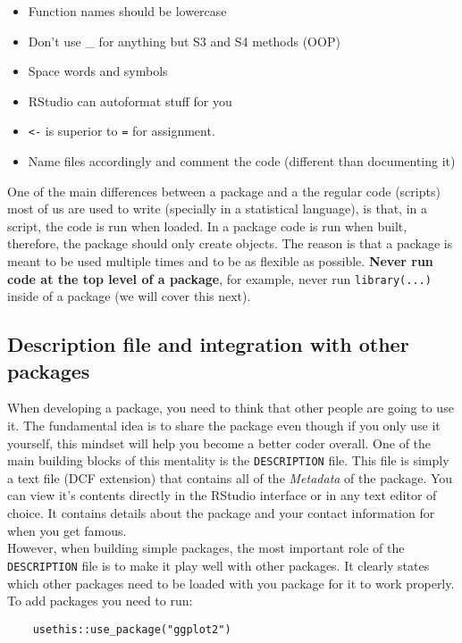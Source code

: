 \documentclass[pdftex,11pt,a4paper]{article}
\begin{document}
\begin{itemize}
	\item Function names should be lowercase 
	\item Don't use \_ for anything but S3 and S4 methods (OOP)
	\item Space words and symbols
	\item RStudio can autoformat stuff for you 
	\item \verb|<-| is superior to \verb|=| for assignment.
	\item Name files accordingly and comment the code (different than documenting it)
\end{itemize}

One of the main differences between a package and a the regular code (scripts) most of us are used to write (specially in a statistical language), is that, in a script, the code is run when loaded. In a package code is run when built, therefore, the package should only create objects. The reason is that a package is meant to be used multiple times and to be as flexible as possible. \textbf{Never run code at the top level of a package}, for example, never run \verb|library(...)| inside of a package (we will cover this next).

\subsection*{Description file and integration with other packages}
When developing a package, you need to think that other people are going to use it. The fundamental idea is to share the package even though if you only use it yourself, this mindset will help you become a better coder overall. One of the main building blocks of this mentality is the \verb|DESCRIPTION| file. This file is simply a text file (DCF extension) that contains all of the \textit{Metadata} of the package. You can view it's contents directly in the RStudio interface or in any text editor of choice. It contains details about the package and your contact information for when you get famous.\\

However, when building simple packages, the most important role of the \verb|DESCRIPTION| file is to make it play well with other packages. It clearly states which other packages need to be loaded with you package for it to work properly. To add packages you need to run:

\begin{verbatim}
	usethis::use_package("ggplot2")
\end{verbatim}
 
\end{document}
